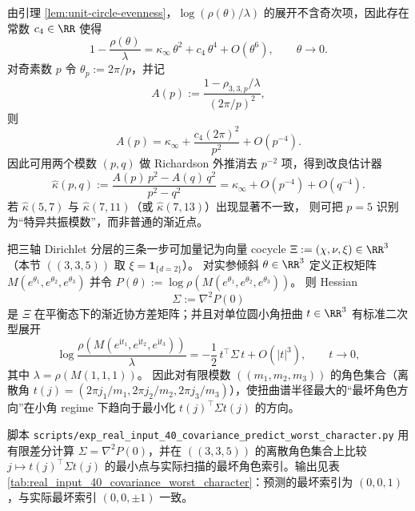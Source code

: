 \begin{remark}\label{rem:arity-335-richardson-kappa}
由引理 \ref{lem:unit-circle-evenness}，$\log(\rho(\theta)/\lambda)$ 的展开不含奇次项，因此存在常数 $c_4\in\RR$ 使得
\[
1-\frac{\rho(\theta)}{\lambda}
=\kappa_\infty\,\theta^2+c_4\,\theta^4+O(\theta^6),
\qquad \theta\to 0.
\]
对奇素数 $p$ 令 $\theta_p:=2\pi/p$，并记
\[
A(p):=\frac{1-\rho_{3,3,p}/\lambda}{(2\pi/p)^2},
\]
则
\[
A(p)=\kappa_\infty+\frac{c_4(2\pi)^2}{p^2}+O(p^{-4}).
\]
因此可用两个模数 $(p,q)$ 做 Richardson 外推消去 $p^{-2}$ 项，得到改良估计器
\[
\widehat\kappa(p,q)
:=\frac{A(p)\,p^2-A(q)\,q^2}{p^2-q^2}
=\kappa_\infty+O(p^{-4})+O(q^{-4}).
\]
若 $\widehat\kappa(5,7)$ 与 $\widehat\kappa(7,11)$（或 $\widehat\kappa(7,13)$）出现显著不一致，
则可把 $p=5$ 识别为“特异共振模数”，而非普通的渐近点。
\end{remark}

\begin{remark}\label{prop:arity-335-worst-direction-cov}
把三轴 Dirichlet 分层的三条一步可加量记为向量 cocycle
\(
\Xi:=(\chi,\nu,\xi)\in\RR^3
\)
（本节 \(((3,3,5))\) 取 \(\xi=\mathbf{1}_{\{d=2\}}\)）。
对实参倾斜 \(\theta\in\RR^3\) 定义正权矩阵 \(M(e^{\theta_1},e^{\theta_2},e^{\theta_3})\) 并令
\(
P(\theta):=\log\rho(M(e^{\theta_1},e^{\theta_2},e^{\theta_3}))
\)。
则 Hessian
\[
\Sigma:=\nabla^2 P(0)
\]
是 \(\Xi\) 在平衡态下的渐近协方差矩阵；并且对单位圆小角扭曲 \(t\in\RR^3\) 有标准二次型展开
\[
\log\frac{\rho(M(e^{\mathrm{i}t_1},e^{\mathrm{i}t_2},e^{\mathrm{i}t_3}))}{\lambda}
=
-\frac12\,t^\top\Sigma\,t
+O(|t|^3),
\qquad t\to 0,
\]
其中 \(\lambda=\rho(M(1,1,1))\)。
因此对有限模数 \(((m_1,m_2,m_3))\) 的角色集合（离散角 \(t(j)=(2\pi j_1/m_1,2\pi j_2/m_2,2\pi j_3/m_3)\)），使扭曲谱半径最大的“最坏角色方向”在小角 regime 下趋向于最小化 \(t(j)^\top\Sigma t(j)\) 的方向。
\end{remark}

\begin{remark}\label{rem:arity-335-worst-direction-cov-check}
脚本 \texttt{scripts/exp\_real\_input\_40\_covariance\_predict\_worst\_character.py} 用有限差分计算 \(\Sigma=\nabla^2P(0)\)，并在 \(((3,3,5))\) 的离散角色集合上比较
\(
j\mapsto t(j)^\top\Sigma t(j)
\)
的最小点与实际扫描的最坏角色索引。输出见表 \ref{tab:real_input_40_covariance_worst_character}：预测的最坏索引为 \((0,0,1)\)，与实际最坏索引 \((0,0,\pm1)\) 一致。
\end{remark}


